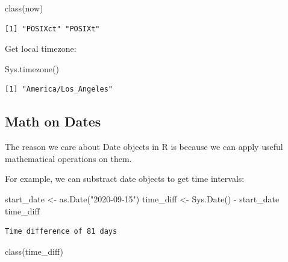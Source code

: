 \documentclass[
]{book}
\newenvironment{Shaded}{\begin{snugshade}}{\end{snugshade}}
\newcommand{\FunctionTok}[1]{\textcolor[rgb]{0.00,0.00,0.00}{#1}}
\newcommand{\NormalTok}[1]{#1}
\newcommand{\OtherTok}[1]{\textcolor[rgb]{0.56,0.35,0.01}{#1}}
\newcommand{\SpecialCharTok}[1]{\textcolor[rgb]{0.00,0.00,0.00}{#1}}
\newcommand{\StringTok}[1]{\textcolor[rgb]{0.31,0.60,0.02}{#1}}
\begin{document}
\begin{Shaded}
\begin{Highlighting}[]
\FunctionTok{class}\NormalTok{(now)}
\end{Highlighting}
\end{Shaded}

\begin{verbatim}
[1] "POSIXct" "POSIXt" 
\end{verbatim}

Get local timezone:

\begin{Shaded}
\begin{Highlighting}[]
\FunctionTok{Sys.timezone}\NormalTok{()}
\end{Highlighting}
\end{Shaded}

\begin{verbatim}
[1] "America/Los_Angeles"
\end{verbatim}

\hypertarget{math-on-dates}{%
\subsection{Math on Dates}\label{math-on-dates}}

The reason we care about Date objects in R is because we can apply useful mathematical operations on them.

For example, we can substract date objects to get time intervals:

\begin{Shaded}
\begin{Highlighting}[]
\NormalTok{start\_date }\OtherTok{\textless{}{-}} \FunctionTok{as.Date}\NormalTok{(}\StringTok{"2020{-}09{-}15"}\NormalTok{)}
\NormalTok{time\_diff }\OtherTok{\textless{}{-}} \FunctionTok{Sys.Date}\NormalTok{() }\SpecialCharTok{{-}}\NormalTok{ start\_date}
\NormalTok{time\_diff}
\end{Highlighting}
\end{Shaded}

\begin{verbatim}
Time difference of 81 days
\end{verbatim}

\begin{Shaded}
\begin{Highlighting}[]
\FunctionTok{class}\NormalTok{(time\_diff)}
\end{Highlighting}
\end{Shaded}
\end{document}
